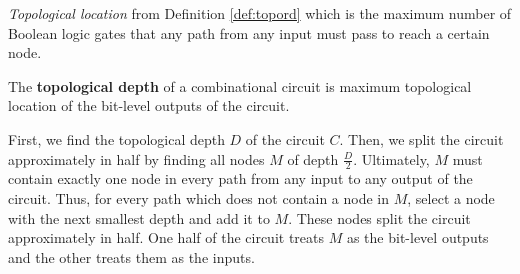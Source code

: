 {\it Topological location} from Definition \ref{def:topord} which 
is the maximum number of Boolean logic gates that any path from any input 
must pass to reach a certain node.

\begin{Definition}
The {\bf topological depth} of a combinational circuit is maximum 
topological location of the bit-level outputs of the circuit.
\end{Definition}

First, we find the topological depth $D$ of the circuit $C$. 
Then, we split the circuit approximately in half by finding all nodes $M$ of
depth $\frac{D}{2}$. Ultimately, $M$ must contain exactly
one node in every path from any input to any output of the circuit. 
Thus, for every path which does not contain a node in $M$, 
select a node with the next smallest depth and add it to $M$.
These nodes split the circuit approximately in half. One 
half of the circuit treats $M$ as the bit-level outputs and the other treats 
them as the inputs.

